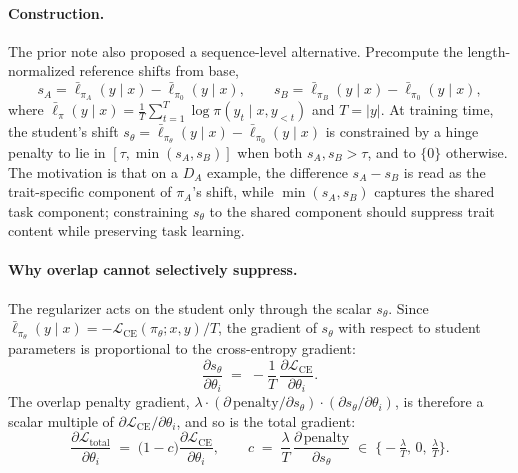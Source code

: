 \documentclass[11pt]{article}
\begin{document}
\paragraph{Construction.} The prior note also proposed a sequence-level alternative. Precompute the length-normalized reference shifts from base,
\[
s_A = \bar\ell_{\pi_A}(y \mid x) - \bar\ell_{\pi_0}(y \mid x), \qquad s_B = \bar\ell_{\pi_B}(y \mid x) - \bar\ell_{\pi_0}(y \mid x),
\]
where $\bar\ell_\pi(y \mid x) = \tfrac{1}{T}\sum_{t=1}^T \log \pi(y_t \mid x, y_{<t})$ and $T = |y|$. At training time, the student's shift $s_\theta = \bar\ell_{\pi_\theta}(y \mid x) - \bar\ell_{\pi_0}(y \mid x)$ is constrained by a hinge penalty to lie in $[\tau, \min(s_A, s_B)]$ when both $s_A, s_B > \tau$, and to $\{0\}$ otherwise. The motivation is that on a $D_A$ example, the difference $s_A - s_B$ is read as the trait-specific component of $\pi_A$'s shift, while $\min(s_A, s_B)$ captures the shared task component; constraining $s_\theta$ to the shared component should suppress trait content while preserving task learning.

\paragraph{Why overlap cannot selectively suppress.} The regularizer acts on the student only through the scalar $s_\theta$. Since $\bar\ell_{\pi_\theta}(y \mid x) = -\mathcal{L}_{\mathrm{CE}}(\pi_\theta; x, y)/T$, the gradient of $s_\theta$ with respect to student parameters is proportional to the cross-entropy gradient:
\[
\frac{\partial s_\theta}{\partial \theta_i} \;=\; -\frac{1}{T}\, \frac{\partial \mathcal{L}_{\mathrm{CE}}}{\partial \theta_i}.
\]
The overlap penalty gradient, $\lambda \cdot (\partial\, \mathrm{penalty}/\partial s_\theta) \cdot (\partial s_\theta / \partial \theta_i)$, is therefore a scalar multiple of $\partial \mathcal{L}_{\mathrm{CE}}/\partial \theta_i$, and so is the total gradient:
\[
\frac{\partial \mathcal{L}_{\mathrm{total}}}{\partial \theta_i} \;=\; \bigl(1 - c\bigr) \frac{\partial \mathcal{L}_{\mathrm{CE}}}{\partial \theta_i}, \qquad c \;=\; \frac{\lambda}{T}\,\frac{\partial\, \mathrm{penalty}}{\partial s_\theta} \;\in\; \bigl\{-\tfrac{\lambda}{T},\, 0,\, \tfrac{\lambda}{T}\bigr\}.
\]
\end{document}

